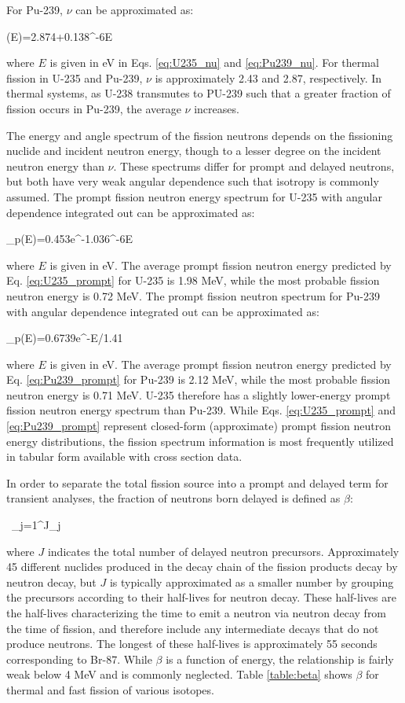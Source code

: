 For Pu-239, \(\nu\) can be approximated as:

\beq
\label{eq:Pu239_nu}
\nu(E)=2.874+0.138^{-6}E
\eeq

where \(E\) is given in eV in Eqs. \eqref{eq:U235_nu} and \eqref{eq:Pu239_nu}. For thermal fission in U-235 and Pu-239, \(\nu\) is approximately 2.43 and 2.87, respectively. In thermal systems, as U-238 transmutes to PU-239 such that a greater fraction of fission occurs in Pu-239, the average \(\nu\) increases.

The energy and angle spectrum of the fission neutrons depends on the fissioning nuclide and incident neutron energy, though to a lesser degree on the incident neutron energy than \(\nu\). These spectrums differ for prompt and delayed neutrons, but both have very weak angular dependence such that isotropy is commonly assumed. The prompt fission neutron energy spectrum for U-235 with angular dependence integrated out can be approximated as:

\beq
\label{eq:U235_prompt}
\chi_p(E)=0.453e^{-1.036^{-6}E}
\eeq

where \(E\) is given in eV. The average prompt fission neutron energy predicted by Eq. \eqref{eq:U235_prompt} for U-235 is 1.98 MeV, while the most probable fission neutron energy is 0.72 MeV. The prompt fission neutron spectrum for Pu-239 with angular dependence integrated out can be approximated as:

\beq
\label{eq:Pu239_prompt}
\chi_p(E)=0.6739e^{-E/1.41}
\eeq

where \(E\) is given in eV. The average prompt fission neutron energy predicted by Eq. \eqref{eq:Pu239_prompt} for Pu-239 is 2.12 MeV, while the most probable fission neutron energy is 0.71 MeV. U-235 therefore has a slightly lower-energy prompt fission neutron energy spectrum than Pu-239. While Eqs. \eqref{eq:U235_prompt} and \eqref{eq:Pu239_prompt} represent closed-form (approximate) prompt fission neutron energy distributions, the fission spectrum information is most frequently utilized in tabular form available with cross section data.

In order to separate the total fission source into a prompt and delayed term for transient analyses, the fraction of neutrons born delayed is defined as \(\beta\):

\beq
\label{eq:BetaDef}
\beta\equiv\ \sum_{j=1}^J\beta_j
\eeq

where \(J\) indicates the total number of delayed neutron precursors. Approximately 45 different nuclides produced in the decay chain of the fission products decay by neutron decay, but \(J\) is typically approximated as a smaller number by grouping the precursors according to their half-lives for neutron decay. These half-lives are the half-lives characterizing the time to emit a neutron via neutron decay from the time of fission, and therefore include any intermediate decays that do not produce neutrons. The longest of these half-lives is approximately 55 seconds corresponding to Br-87. While \(\beta\) is a function of energy, the relationship is fairly weak below 4 MeV and is commonly neglected. Table \ref{table:beta} shows \(\beta\) for thermal and fast fission of various isotopes. 

